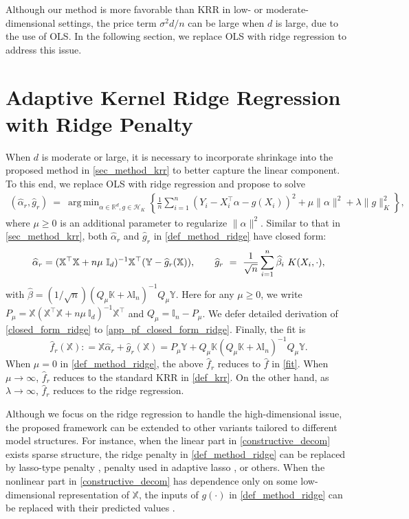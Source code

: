 \documentclass[11pt,twoside]{article}
\DeclareMathOperator*{\argmin}{arg\,min}
\def\KK{\mathbb{K}}
\def\II{\mathbb{I}}
\def\YY{\mathbb{Y}}
\def\XX{\mathbb{X}}
\def\RR{\mathbb{R}}
\def\cH{\mathcal H}
\def\wh{\widehat}
\def\T{\top}
\def\l{\left}
\def\r{\right}
\begin{document}
Although our method is more favorable than KRR in low- or moderate-dimensional settings, the price term $\sigma^2 d/n$ can be large when $d$ is large, due to the use of OLS. In the following section, we replace OLS with ridge regression to address this issue.


  

\section{Adaptive Kernel Ridge Regression with Ridge Penalty}\label{sec_ridge}

When $d$ is moderate or large, it is necessary to incorporate shrinkage into the proposed method in \cref{sec_method_krr} to better capture the linear component. To this end, we replace OLS with ridge regression and propose to solve 
\begin{align}\label{def_method_ridge}
(\wh \alpha_r, \wh g_r ) 
~ =~ \argmin_{\alpha\in \RR^d,  g \in \cH_K}  \left\{ \frac{1}{n} \sum_{i=1}^n\l (Y_i- X_i ^\T  \alpha - g(X_i)\r)^2 + \mu \|\alpha\|^2  +\lambda \|g\|_K^2 \right\},
\end{align}
where  $\mu\ge 0$ is  an additional parameter to regularize $\|\alpha\|^2$.
Similar to that in \cref{sec_method_krr}, both $\wh \alpha_r$ and 
$\wh g_r $ in \eqref{def_method_ridge} have closed form:
\begin{align} \label{closed_form_ridge}
     \wh \alpha_r = ( \XX ^\T \XX+ n \mu  ~ \II_d) ^{-1}  \XX^\T (\YY -  \wh g_r(\XX)), \qquad 
\wh g_r
~ =~ { 1\over \sqrt{n}} \sum_{i=1}^n \wh \beta_i ~K(X_i,\cdot),
\end{align}
with $\wh \beta  = (1/ \sqrt n)(Q_\mu   \KK+ \lambda \II_n)^{-1} Q_\mu \YY.$ Here  for any $\mu\ge 0$, we write $P_\mu =\XX (\XX^\T\XX + n \mu~  \II_d )^{-1} \XX^\T $ and 
$ Q_\mu =\II_n - P_\mu  $.
We defer detailed derivation of \eqref{closed_form_ridge} to \cref{app_pf_closed_form_ridge}.
Finally,  the fit  is 
\begin{equation}\label{fit_ridge}
    \wh f_r(\XX) :  = \XX \wh \alpha_r + \wh g_r(\XX) = P_{\mu} \YY +  Q_\mu \KK( Q_\mu \KK +\lambda \II_n )^{-1} Q_\mu \YY.
\end{equation}  
When $\mu = 0$ in \eqref{def_method_ridge}, 
the above $\wh f_r$ reduces to $\wh f$ in \eqref{fit}.  
When $\mu \to \infty$, $\wh f_r$ reduces to the standard KRR in \eqref{def_krr}.
On the other hand, as $\lambda\to\infty$, $\wh f_r$ reduces to the ridge regression.

Although we focus on the ridge regression to handle the high-dimensional issue, the proposed framework can be extended to other variants tailored to different model structures.
For instance, when  the linear part in \eqref{constructive_decom} exists sparse structure,    the ridge penalty in \eqref{def_method_ridge} 
can be replaced by lasso-type penalty \citep{tibshirani1996regression},  penalty used in  adaptive lasso \citep{zou2006adaptive}, or others. 
When  the nonlinear part in \eqref{constructive_decom} has dependence only on  some low-dimensional  
representation of $\XX$, the inputs of $g(\cdot)$ in \eqref{def_method_ridge} can be replaced with their predicted values  \citep{bing2025kernel}.\\
\end{document}
